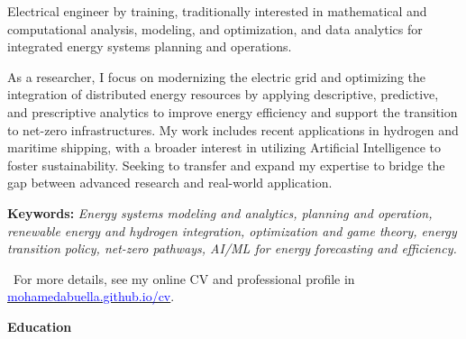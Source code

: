 \documentclass[11pt,letterpaper,sans]{moderncv}
\renewcommand*{\section}[1]{%
  \vspace{1.5ex}%
  {\color{myred}\bfseries\Large #1}\par%
  \vspace{0.5ex}%
}
\begin{document}
Electrical engineer by training, traditionally interested in mathematical and computational analysis, modeling, and optimization, and data analytics for integrated energy systems planning and operations.

As a researcher, I focus on modernizing the electric grid and optimizing the integration of distributed energy resources by applying descriptive, predictive, and prescriptive analytics to improve energy efficiency and support the transition to net-zero infrastructures. My work includes recent applications in hydrogen and maritime shipping, with a broader interest in utilizing Artificial Intelligence to foster sustainability. Seeking to transfer and expand my expertise to bridge the gap between advanced research and real-world application.

\textbf{Keywords:} \textit{Energy systems modeling and analytics, planning and operation, renewable energy and hydrogen integration, optimization and game theory, energy transition policy, net-zero pathways, AI/ML for energy forecasting and efficiency.}



{\faLink}\, For more details, see my online CV and professional profile in
\href{https://mohamedabuella.github.io/cv/}{\textcolor{blue}{mohamedabuella.github.io/cv}}.

\section{Education}

\end{document}

